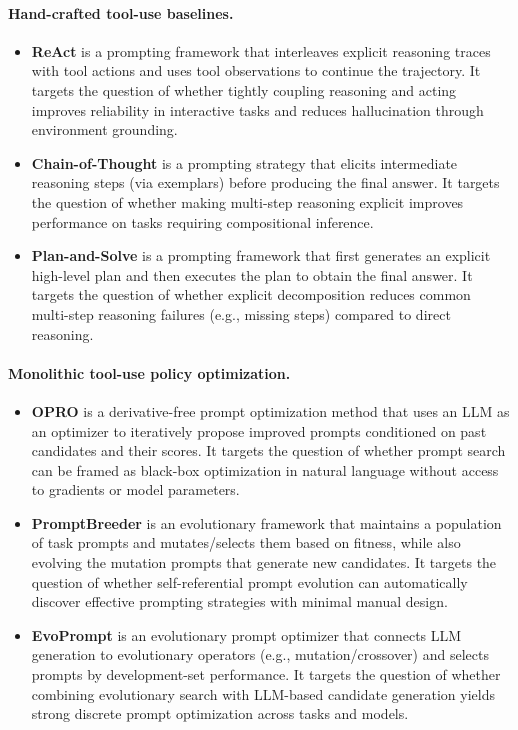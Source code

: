 \documentclass[11pt]{article}
\begin{document}
\paragraph{Hand-crafted tool-use baselines.}
\begin{itemize}
  \item \textbf{ReAct} \cite{yao2022react} is a prompting framework that interleaves explicit reasoning traces with tool actions and uses tool observations to continue the trajectory. It targets the question of whether tightly coupling reasoning and acting improves reliability in interactive tasks and reduces hallucination through environment grounding.

  \item \textbf{Chain-of-Thought} \cite[CoT,][]{wei2022chain} is a prompting strategy that elicits intermediate reasoning steps (via exemplars) before producing the final answer. It targets the question of whether making multi-step reasoning explicit improves performance on tasks requiring compositional inference.

  \item \textbf{Plan-and-Solve} \cite{wang-etal-2023-plan} is a prompting framework that first generates an explicit high-level plan and then executes the plan to obtain the final answer. It targets the question of whether explicit decomposition reduces common multi-step reasoning failures (e.g., missing steps) compared to direct reasoning.
\end{itemize}

\paragraph{Monolithic tool-use policy optimization.}
\begin{itemize}
  \item \textbf{OPRO} \cite{yang2023large} is a derivative-free prompt optimization method that uses an LLM as an optimizer to iteratively propose improved prompts conditioned on past candidates and their scores. It targets the question of whether prompt search can be framed as black-box optimization in natural language without access to gradients or model parameters.

  \item \textbf{PromptBreeder} \cite{fernando2023promptbreeder} is an evolutionary framework that maintains a population of task prompts and mutates/selects them based on fitness, while also evolving the mutation prompts that generate new candidates. It targets the question of whether self-referential prompt evolution can automatically discover effective prompting strategies with minimal manual design.

  \item \textbf{EvoPrompt} \cite{guo2023connecting} is an evolutionary prompt optimizer that connects LLM generation to evolutionary operators (e.g., mutation/crossover) and selects prompts by development-set performance. It targets the question of whether combining evolutionary search with LLM-based candidate generation yields strong discrete prompt optimization across tasks and models.
\end{itemize}
\end{document}
